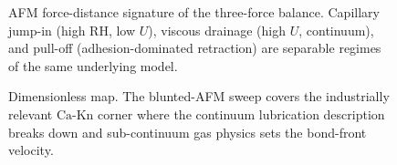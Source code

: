 \documentclass[11pt]{article}
\begin{document}
\begin{figure}[H]
    \begin{center}
        \caption{AFM force-distance signature of the three-force balance. Capillary jump-in (high RH, low $U$), viscous drainage (high $U$, continuum), and pull-off (adhesion-dominated retraction) are separable regimes of the same underlying model.}
        \label{fig:afm-fd}
    \end{center}
\end{figure}

\begin{figure}[H]
    \begin{center}
        \caption{Dimensionless map. The blunted-AFM sweep covers the industrially relevant $\mathrm{Ca}$-$\mathrm{Kn}$ corner where the continuum lubrication description breaks down and sub-continuum gas physics sets the bond-front velocity.}
        \label{fig:regime-map}
    \end{center}
\end{figure}
\end{document}
